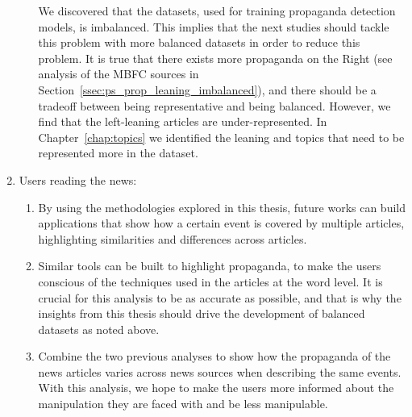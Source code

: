 \begin{enumerate}
\begin{enumerate}
                    We discovered that the datasets, used for training propaganda detection models, is imbalanced. This implies that the next studies should tackle this problem with more balanced datasets in order to reduce this problem.
                    It is true that there exists more propaganda on the Right (see analysis of the MBFC sources in Section~\ref{ssec:ps_prop_leaning_imbalanced}), and there should be a tradeoff between being representative and being balanced. However, we find that the left-leaning articles are under-represented.
                    In Chapter~\ref{chap:topics} we identified the leaning and topics that need to be represented more in the dataset. %
          \end{enumerate}%
    \item Users reading the news:
          \begin{enumerate}
              \item By using the methodologies explored in this thesis, future works can build applications that show how a certain event is covered by multiple articles, highlighting similarities and differences across articles.%
              \item Similar tools can be built to highlight propaganda, to make the users conscious of the techniques used in the articles at the word level. It is crucial for this analysis to be as accurate as possible, and that is why the insights from this thesis should drive the development of balanced datasets as noted above.
              \item Combine the two previous analyses to show how the propaganda of the news articles varies across news sources when describing the same events. With this analysis, we hope to make the users more informed about the manipulation they are faced with and be less manipulable.
          \end{enumerate}
\end{enumerate}

